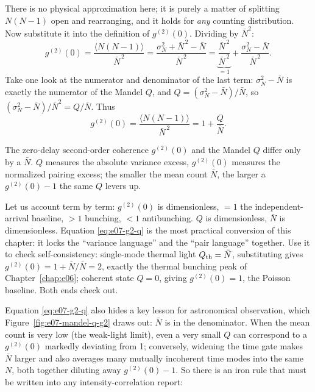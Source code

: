 There is no physical approximation here; it is purely a matter of splitting \(N(N-1)\) open and rearranging, and it holds for \emph{any} counting distribution. Now substitute it into the definition of \(g^{(2)}(0)\). Dividing by \(\bar N^2\):
\[
  g^{(2)}(0)=\frac{\langle N(N-1)\rangle}{\bar N^{\,2}}
  =\frac{\sigma_N^2+\bar N^{\,2}-\bar N}{\bar N^{\,2}}
  =\underbrace{\frac{\bar N^{\,2}}{\bar N^{\,2}}}_{=1}
  +\frac{\sigma_N^2-\bar N}{\bar N^{\,2}} .
\]
Take one look at the numerator and denominator of the last term: \(\sigma_N^2-\bar N\) is exactly the numerator of the Mandel \(Q\), and \(Q=(\sigma_N^2-\bar N)/\bar N\), so \((\sigma_N^2-\bar N)/\bar N^2=Q/\bar N\). Thus
\begin{equation}
  g^{(2)}(0)=\frac{\langle N(N-1)\rangle}{\bar N^{\,2}}
  =1+\frac{Q}{\bar N}.
  \label{eq:e07-g2-q}
\end{equation}
\begin{formulaexplain}
The zero-delay second-order coherence \(g^{(2)}(0)\) and the Mandel \(Q\) differ only by a \(\bar N\). \(Q\) measures the absolute variance excess, \(g^{(2)}(0)\) measures the normalized pairing excess; the smaller the mean count \(\bar N\), the larger a \(g^{(2)}(0)-1\) the same \(Q\) levers up.
\end{formulaexplain}

Let us account term by term: \(g^{(2)}(0)\) is dimensionless, \(=1\) the independent-arrival baseline, \(>1\) bunching, \(<1\) antibunching. \(Q\) is dimensionless, \(\bar N\) is dimensionless. Equation \eqref{eq:e07-g2-q} is the most practical conversion of this chapter: it locks the ``variance language'' and the ``pair language'' together. Use it to check self-consistency: single-mode thermal light \(Q_{\rm th}=\bar N\), substituting gives \(g^{(2)}(0)=1+\bar N/\bar N=2\), exactly the thermal bunching peak of Chapter~\ref{chap:e06}; coherent state \(Q=0\), giving \(g^{(2)}(0)=1\), the Poisson baseline. Both ends check out.

Equation \eqref{eq:e07-g2-q} also hides a key lesson for astronomical observation, which Figure~\ref{fig:e07-mandel-q-g2} draws out: \(\bar N\) is in the denominator. When the mean count is very low (the weak-light limit), even a very small \(Q\) can correspond to a \(g^{(2)}(0)\) markedly deviating from 1; conversely, widening the time gate makes \(\bar N\) larger and also averages many mutually incoherent time modes into the same \(N\), both together diluting away \(g^{(2)}(0)-1\). So there is an iron rule that must be written into any intensity-correlation report:


